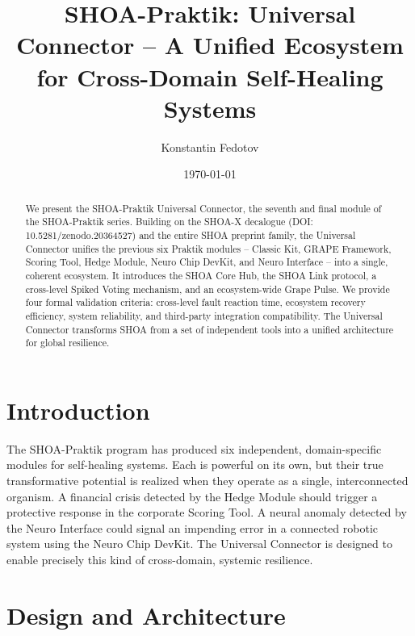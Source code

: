 \documentclass[12pt]{article}
\title{SHOA-Praktik: Universal Connector -- A Unified Ecosystem for Cross-Domain Self-Healing Systems}
\author{Konstantin Fedotov}
\date{\today}
\begin{document}
\maketitle

\begin{abstract}
We present the SHOA-Praktik Universal Connector, the seventh and final module of the SHOA-Praktik series. Building on the SHOA-X decalogue (DOI: 10.5281/zenodo.20364527) and the entire SHOA preprint family, the Universal Connector unifies the previous six Praktik modules -- Classic Kit, GRAPE Framework, Scoring Tool, Hedge Module, Neuro Chip DevKit, and Neuro Interface -- into a single, coherent ecosystem. It introduces the SHOA Core Hub, the SHOA Link protocol, a cross-level Spiked Voting mechanism, and an ecosystem-wide Grape Pulse. We provide four formal validation criteria: cross-level fault reaction time, ecosystem recovery efficiency, system reliability, and third-party integration compatibility. The Universal Connector transforms SHOA from a set of independent tools into a unified architecture for global resilience.
\end{abstract}

\section{Introduction}
The SHOA-Praktik program has produced six independent, domain-specific modules for self-healing systems. Each is powerful on its own, but their true transformative potential is realized when they operate as a single, interconnected organism. A financial crisis detected by the Hedge Module should trigger a protective response in the corporate Scoring Tool. A neural anomaly detected by the Neuro Interface could signal an impending error in a connected robotic system using the Neuro Chip DevKit. The Universal Connector is designed to enable precisely this kind of cross-domain, systemic resilience.

\section{Design and Architecture}
\end{document}

